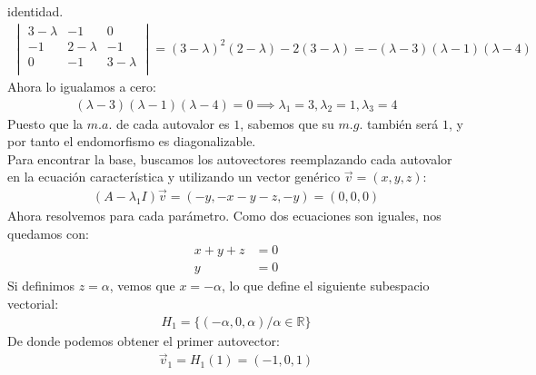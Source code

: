 \documentclass{article}
\begin{document}
\begin{enumerate}[label={(\alph*)}]
		identidad.
\begin{equation}
	\begin{split}
		\begin{vmatrix}
3-\lambda & -1 & 0 \\
-1 & 2-\lambda  & -1 \\
0 & -1 & 3-\lambda \\
\end{vmatrix}=(3-\lambda)^{2}(2-\lambda)-2(3-\lambda)=-(\lambda -3)(\lambda -1)(\lambda -4)
	\end{split}
\end{equation}
Ahora lo igualamos a cero:
\begin{equation}
	\begin{split}
		(\lambda -3)(\lambda -1)(\lambda-4)=0 \implies \lambda_1=3,\lambda_2=1,\lambda_3=4	
	\end{split}
\end{equation}
Puesto que la \(m.a.\) de cada autovalor es \(1\), sabemos que su \(m.g.\) también será \(1\),
y por tanto el endomorfismo es diagonalizable.\\
Para encontrar la base, buscamos los autovectores reemplazando cada autovalor en la ecuación
característica y utilizando un vector genérico \(\vec{v}=(x,y,z)\):
\begin{equation}
	\begin{split}
		(A-\lambda_1 I)\vec{v}=(-y,-x-y-z,-y)=(0,0,0)
	\end{split}
\end{equation}
Ahora resolvemos para cada parámetro. Como dos ecuaciones son iguales, nos quedamos con:
\begin{equation}
	\begin{split}
		x+y+z &=0 \\ y &= 0
	\end{split}
\end{equation}
Si definimos \(z = \alpha\), vemos que \(x = -\alpha\), lo que define el siguiente subespacio
vectorial:
\begin{equation}
	\begin{split}
		H_1=\{ (-\alpha,0,\alpha) / \alpha \in \mathbb{R} \}
	\end{split}
\end{equation}
De donde podemos obtener el primer autovector:
\begin{equation}
	\begin{split}
		\vec{v}_1=H_1(1)=(-1,0,1)
	\end{split}
\end{equation}

\end{enumerate}
\end{document}
